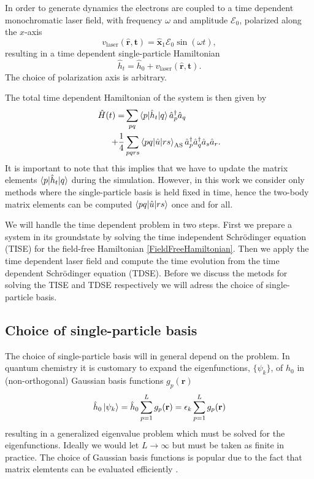 \documentclass[aip,jcp,reprint,floatfix]{revtex4-1}
\begin{document}
In order to generate dynamics the electrons are coupled to a time
dependent monochromatic laser field, with frequency $\omega$ and
amplitude $\mathcal{E}_0$, polarized along the $x$-axis
\cite{Zanghellini04}
\begin{equation}
 v_{\text{laser}}(\mathbf{\hat{r},t}) = \hat{\mathbf{x}}_1 \mathcal{E}_0 \sin(\omega t),
\end{equation}
resulting in a time dependent single-particle Hamiltonian
\begin{equation}
 \hat{h}_t = \hat{h}_0 + v_{\text{laser}}(\mathbf{\hat{r},t}).
\end{equation}
The choice of polarization axis is arbitrary. 

The total time dependent Hamiltonian of the system is then given by
\begin{align}
 \hat{H}(t) = &\sum_{pq} \braket{p|\hat{h}_t|q}\hat{a}_p^\dagger\hat{a}_q \nonumber \\
 + \frac{1}{4}&\sum_{pqrs}\braket{pq|\hat{u}|rs}_{\text{AS}}\hat{a}_p^\dagger\hat{a}_q^\dagger\hat{a}_s\hat{a}_r.
\end{align}
It is important to note that this implies that we have to update the
matrix elements $\braket{p|\hat{h}_t|q}$ during the
simulation. However, in this work we consider only methods where the
single-particle basis is held fixed in time, hence the two-body matrix
elements can be computed $\braket{pq|\hat{u}|rs}$ once and for all.

We will handle the time dependent problem in two steps. First we
prepare a system in its groundstate by solving the time independent
Schrödinger equation (TISE) for the field-free Hamiltonian
\eqref{FieldFreeHamiltonian}.  Then we apply the time dependent laser
field and compute the time evolution from the time dependent
Schrödinger equation (TDSE).  Before we discuss the metods for solving
the TISE and TDSE respectively we will adress the choice of
single-particle basis.

\subsection{Choice of single-particle basis}
The choice of single-particle basis will in general depend on the
problem. In quantum chemistry it is customary to expand the
eigenfunctions, $\{ \psi_k \}$, of $\hat{h}_0$ in (non-orthogonal)
Gaussian basis functions $g_p(\mathbf{r})$
\begin{equation}
 \hat{h}_0 \ket{\psi_k} = \hat{h}_0 \sum_{p=1}^L g_p(\mathbf{r}) = \epsilon_k \sum_{p=1}^L g_p(\mathbf{r})
\end{equation}
resulting in a generalized eigenvalue problem which must be solved for
the eigenfunctions. Ideally we would let $L \rightarrow \infty$ but
must be taken as finite in practice.  The choice of Gaussian basis
functions is popular due to the fact that matrix elemtents can be
evaluated efficiently \cite{Helgaker00book}.
\end{document}
